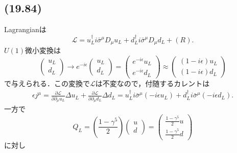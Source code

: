 \subsection{(19.84)}
Lagrangianは
\[
\mathcal{L} = u_L^\dagger i \bar\sigma^\mu D_\mu u_L + d_L^\dagger i \bar\sigma^\mu D_\mu d_L + (R) .
\]
$U(1)$微小変換は
\[
\begin{pmatrix}
  u_L \\ d_L
\end{pmatrix}
\to e^{-i\epsilon}
\begin{pmatrix}
  u_L \\ d_L
\end{pmatrix}
=
\begin{pmatrix}
  e^{-i\epsilon} u_L \\ e^{-i\epsilon} d_L
\end{pmatrix}
\approx
\begin{pmatrix}
  (1-i\epsilon) u_L \\ (1-i\epsilon) d_L
\end{pmatrix}
\]
で与えられる．この変換で$\mathcal{L}$は不変なので，付随するカレントは
\begin{align*}
  \epsilon j^\mu = \frac{\partial\mathcal{L}}{\partial \partial_\mu u_L} \Delta u_L
  + \frac{\partial\mathcal{L}}{\partial \partial_\mu d_L} \Delta d_L
  = u_L^\dagger i \bar\sigma^\mu (-i\epsilon u_L) + d_L^\dagger i \bar\sigma^\mu (-i\epsilon d_L) .
\end{align*}
一方で
\[
Q_L = \left( \frac{1-\gamma^5}{2} \right)
\begin{pmatrix}
  u \\ d
\end{pmatrix}
= \begin{pmatrix}
   \frac{1-\gamma^5}{2} u \\ \frac{1-\gamma^5}{2} d
\end{pmatrix}
\]
に対し
